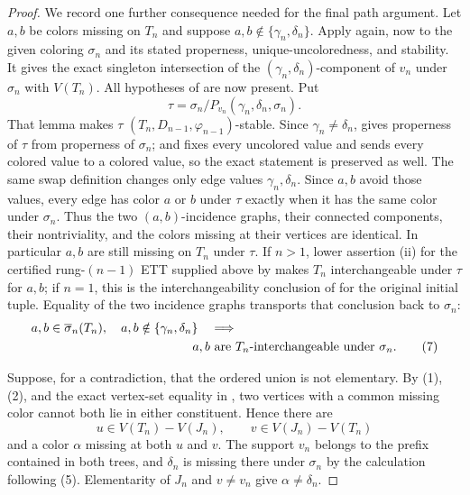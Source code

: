 \begin{proof}
We record one further consequence needed for the final path argument.
Let $a,b$ be colors missing on $T_n$ and suppose
$a,b\notin\{\gamma_n,\delta_n\}$.  Apply  again,
now to the given coloring $\sigma_n$ and its stated properness,
unique-uncoloredness, and stability.  It gives the exact singleton
intersection of the $(\gamma_n,\delta_n)$-component of $v_n$ under
$\sigma_n$ with $V(T_n)$.  All hypotheses of
 are now present.  Put
\[
 \tau=\sigma_n/P_{v_n}(\gamma_n,\delta_n,\sigma_n).
\]
That lemma makes $\tau$
$(T_n,D_{n-1},\varphi_{n-1})$-stable.  Since
$\gamma_n\ne\delta_n$,
 gives properness of $\tau$ from
properness of $\sigma_n$; and  fixes every
uncolored value and sends every colored value to a colored value, so the
exact statement  is preserved as well.
The same swap definition changes only edge values
$\gamma_n,\delta_n$.  Since $a,b$ avoid those values, every edge has
color $a$ or $b$ under $\tau$ exactly when it has the same color under
$\sigma_n$.  Thus the two $(a,b)$-incidence graphs, their connected
components, their nontriviality, and the colors missing at their vertices
are identical.  In particular $a,b$ are still missing on $T_n$ under
$\tau$.  If $n>1$, lower assertion (ii) for the certified rung-$(n-1)$
ETT supplied above by  makes $T_n$
interchangeable under $\tau$ for $a,b$; if $n=1$, this
is the interchangeability conclusion of
 for the original initial tuple.  Equality
of the two incidence graphs transports that conclusion back to
$\sigma_n$:
\[
 \begin{split}
 &a,b\in\overline\sigma_n(T_n),\quad
   a,b\notin\{\gamma_n,\delta_n\}\quad\Longrightarrow\\
 &\hspace{45mm}a,b\text{ are $T_n$-interchangeable under }\sigma_n.
                                                               \tag{7}
 \end{split}
\]

Suppose, for a contradiction, that the ordered union is not elementary.
By (1), (2), and the exact vertex-set equality in
, two vertices with a common missing color
cannot both lie in either constituent.  Hence there are
\[
 u\in V(T_n)-V(J_n),\qquad v\in V(J_n)-V(T_n)
\]
and a color $\alpha$ missing at both $u$ and $v$.  The support $v_n$
belongs to the prefix contained in both trees, and $\delta_n$ is missing
there under $\sigma_n$ by the calculation following (5).  Elementarity
of $J_n$ and $v\ne v_n$ give $\alpha\ne\delta_n$.


\end{proof}
